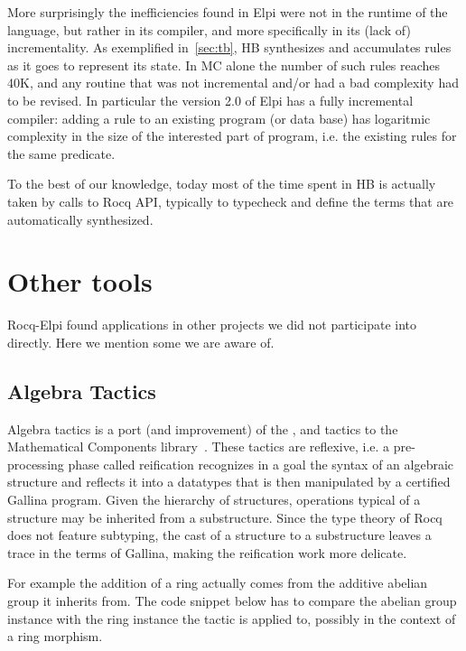 \documentclass[a4paper, 11pt]{book}
\begin{document}
More surprisingly the inefficiencies found in Elpi were not in the runtime
of the language, but rather in its compiler, and more specifically in
its (lack of) incrementality. As exemplified in~\cref{sec:tb}, HB synthesizes
and accumulates rules as it goes to represent its state. In MC alone
the number of such rules reaches 40K, and any routine that was not incremental
and/or had a bad complexity had to be revised. In particular the version 2.0 of
Elpi has a fully incremental compiler: adding a rule to an existing program (or
data base) has logaritmic complexity in the size of the interested
part of program, i.e. the existing rules for the same predicate.

To the best of our knowledge, today most of the time spent in HB is actually taken
by calls to Rocq API, typically to typecheck and define the terms that are
automatically synthesized.

\section{Other tools}

Rocq-Elpi found applications in other projects we did not participate
into directly. Here we mention some we are aware of.

\subsection{Algebra Tactics}

Algebra tactics is a port (and improvement) of the ,  and
 tactics to the Mathematical Components library~\cite{sakaguchi:LIPIcs.ITP.2022.29}.
These tactics are reflexive, i.e. a pre-processing phase called reification
recognizes in a goal the syntax of an algebraic structure and reflects it into
a datatypes that is then manipulated by a certified Gallina program.
Given the hierarchy of structures, operations typical of a structure may be
inherited from a substructure. Since the type theory of Rocq does not feature
subtyping, the cast of a structure to a substructure leaves a trace in
the terms of Gallina, making the reification work more delicate.

For example the addition of a ring actually comes from the
additive abelian group it inherits from. The code snippet below
has to compare the abelian group instance  with the ring
instance  the tactic is applied to, possibly in the context
 of a ring morphism.
\end{document}
